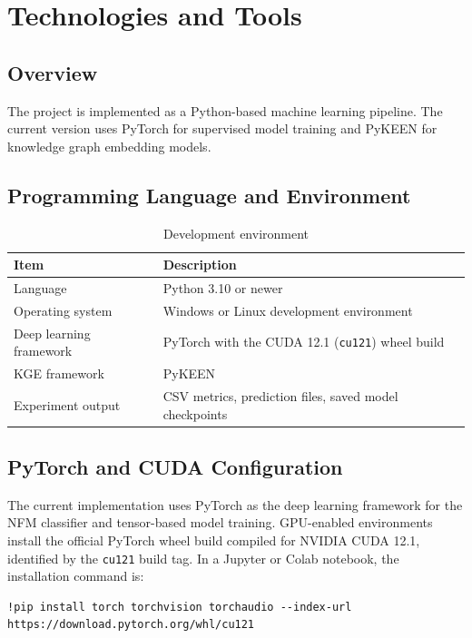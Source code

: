 \chapter{Technologies and Tools}
\label{chap:technologies}

\section{Overview}

The project is implemented as a Python-based machine learning pipeline. The
current version uses PyTorch for supervised model training and PyKEEN for
knowledge graph embedding models.

\section{Programming Language and Environment}

\begin{table}[H]
\centering
\caption{Development environment}
\label{tab:development_environment}
\begin{tabularx}{\textwidth}{lX}
\toprule
\textbf{Item} & \textbf{Description} \\
\midrule
Language & Python 3.10 or newer \\
Operating system & Windows or Linux development environment \\
Deep learning framework & PyTorch with the CUDA 12.1 (\texttt{cu121}) wheel build \\
KGE framework & PyKEEN \\
Experiment output & CSV metrics, prediction files, saved model checkpoints \\
\bottomrule
\end{tabularx}
\end{table}

\section{PyTorch and CUDA Configuration}

The current implementation uses PyTorch as the deep learning framework for
the NFM classifier and tensor-based model training. GPU-enabled environments
install the official PyTorch wheel build compiled for NVIDIA CUDA 12.1,
identified by the \texttt{cu121} build tag. In a Jupyter or Colab notebook,
the installation command is:

\begin{lstlisting}[caption={Installing the PyTorch CUDA 12.1 wheel build}]
!pip install torch torchvision torchaudio --index-url https://download.pytorch.org/whl/cu121
\end{lstlisting}

